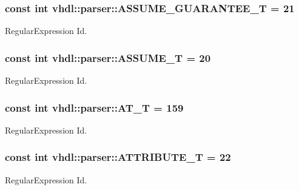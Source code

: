 \subsubsection[{A\+S\+S\+U\+M\+E\+\_\+\+G\+U\+A\+R\+A\+N\+T\+E\+E\+\_\+\+T}]{\setlength{\rightskip}{0pt plus 5cm}const int vhdl\+::parser\+::\+A\+S\+S\+U\+M\+E\+\_\+\+G\+U\+A\+R\+A\+N\+T\+E\+E\+\_\+\+T = 21}\label{namespacevhdl_1_1parser_a4f617d03b545413796de058cbed816a1}
Regular\+Expression Id. \hypertarget{namespacevhdl_1_1parser_a793202f840f2823323ddb118eca58426}{}
\subsubsection[{A\+S\+S\+U\+M\+E\+\_\+\+T}]{\setlength{\rightskip}{0pt plus 5cm}const int vhdl\+::parser\+::\+A\+S\+S\+U\+M\+E\+\_\+\+T = 20}\label{namespacevhdl_1_1parser_a793202f840f2823323ddb118eca58426}
Regular\+Expression Id. \hypertarget{namespacevhdl_1_1parser_aaf79eadff79e2b2343fd7a4827092e95}{}
\subsubsection[{A\+T\+\_\+\+T}]{\setlength{\rightskip}{0pt plus 5cm}const int vhdl\+::parser\+::\+A\+T\+\_\+\+T = 159}\label{namespacevhdl_1_1parser_aaf79eadff79e2b2343fd7a4827092e95}
Regular\+Expression Id. \hypertarget{namespacevhdl_1_1parser_a6f331d01157277e5275c651d2d0b6677}{}
\subsubsection[{A\+T\+T\+R\+I\+B\+U\+T\+E\+\_\+\+T}]{\setlength{\rightskip}{0pt plus 5cm}const int vhdl\+::parser\+::\+A\+T\+T\+R\+I\+B\+U\+T\+E\+\_\+\+T = 22}\label{namespacevhdl_1_1parser_a6f331d01157277e5275c651d2d0b6677}
Regular\+Expression Id. \hypertarget{namespacevhdl_1_1parser_aeb72a26f3c50753562a2faccb6c7b5e6}{}
